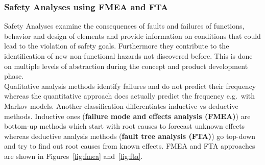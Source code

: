 \subsubsection*{Safety Analyses using FMEA and FTA}
Safety Analyses examine the consequences of faults and failures of functions, behavior and design of elements and provide information on conditions that could lead to the violation of safety goals.
Furthermore they contribute to the identification of new non-functional hazards not discovered before.
This is done on multiple levels of abstraction during the concept and product development phase.\\
Qualitative analysis methods identify failures and do not predict their frequency whereas the quantitative approach does actually predict the frequency e.g.\ with Markov models.
Another classification differentiates inductive vs deductive methods.
Inductive ones (\textbf{failure mode and effects analysis (FMEA)}) are bottom-up methods which start with root causes to forecast unknown effects whereas deductive analysis methods (\textbf{fault tree analysis (FTA)}) go top-down and try to find out root causes from known effects.
FMEA and FTA approaches are shown in Figures~\ref{fig:fmea} and~\ref{fig:fta}.
